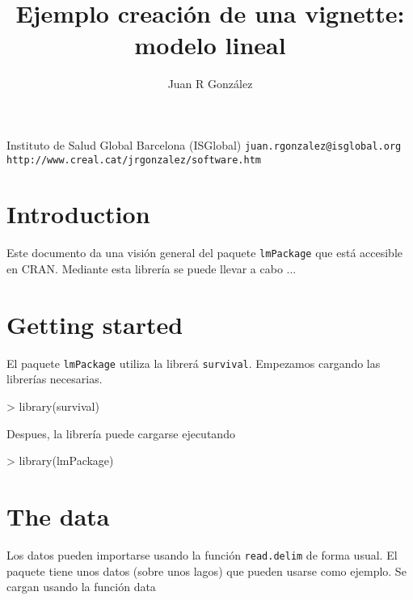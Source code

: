 \documentclass[11pt]{article}
\begin{document}


\title{\bf Ejemplo creaci\'on de una vignette: modelo lineal}
\vspace{1cm}
\author{Juan R Gonz\'alez}

\maketitle

\begin{center}
  Instituto de Salud Global Barcelona (ISGlobal)
  \vspace{1cm}
  {\tt juan.rgonzalez@isglobal.org}
  {\tt http://www.creal.cat/jrgonzalez/software.htm}
\end{center}

\tableofcontents

\section{Introduction}

Este documento da una visi\'on general del paquete {\tt lmPackage} que est\'a
accesible en CRAN.  Mediante esta librer\'ia se puede llevar a cabo ...

\section{Getting started}
\noindent El paquete {\tt lmPackage} utiliza la librer\'a {\tt survival}.  Empezamos cargando las librer\'ias necesarias.

\begin{Schunk}
\begin{Sinput}
> library(survival)
\end{Sinput}
\end{Schunk}

\noindent Despues, la librer\'ia puede cargarse ejecutando

\begin{Schunk}
\begin{Sinput}
> library(lmPackage)
\end{Sinput}
\end{Schunk}


\section{The data}

\noindent Los datos pueden importarse usando la funci\'on {\tt read.delim} de forma usual. El paquete tiene unos datos (sobre unos lagos) que pueden usarse como ejemplo. Se cargan usando  la funci\'on data
\end{document}
